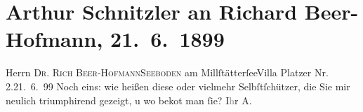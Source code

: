 

         
         \renewcommand{\erwaehntePersonen}{Personen: Richard Beer-Hofmann}
         \renewcommand{\erwaehnteOrte}{Orte: IX., Alsergrund, Seeboden, Villa Platzer, Wien}
         \renewcommand{\erwaehnteWerke}{}
               \section[Arthur Schnitzler an Richard Beer-Hofmann, 21. 6. 1899]{ Arthur Schnitzler an Richard Beer-Hofmann, 21. 6. 1899}\nopagebreak{}\rehead{ }\begin{ledgroupsized}[t]{13cm}\normalsize\beginnumbering \toendnotes[C]{\smallbreak\pagebreak[2]} 
\toendnotes[C]{\smallbreak}\pstart{}{\pb}Herrn \textsc{Dr. Rich
                     Beer-Hofmann}\pend{}\pstart{}\textsc{Seeboden} am Millſtätterſee\pend{}\pstart{}Villa Platzer\pend{}{\bigskip}\pstart
           \noindent{}{\pb}Nr.{ }2.\hfill 21. 6. 99\pend
           \pstart
           Noch eins:\pend
           \pstart
           wie heißen diese \label{K_L00929_1v}\label{K_L00929_1h} oder vielmehr
               Selbſtſchützer, die Sie mir neulich triumphirend gezeigt, u wo beko{\geminationm}t man ſie?\pend
           \pstart I\textcolor{gray}{h}r \spacefill\mbox{A.}\pend{}
         
         \endnumbering{}\end{ledgroupsized}  \newcommand{\dateiname}{L00929}\newcommand{\titel}{Arthur Schnitzler an Richard Beer-Hofmann, 21. 6. 1899}\newcommand{\editorInnen}{Martin Anton Müller und Gerd-Hermann Susen}
      